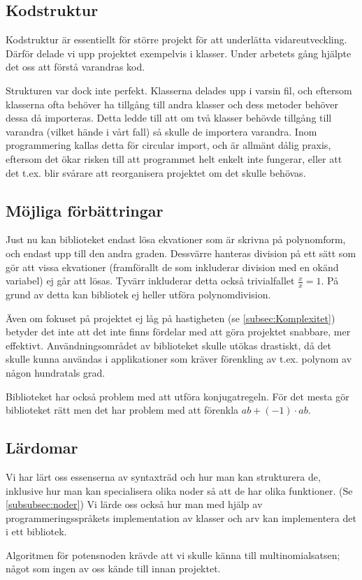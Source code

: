 \documentclass[12pt,a4paper]{article}
\begin{document}
\subsection{Kodstruktur}
Kodstruktur är essentiellt för större projekt för att underlätta vidareutveckling. Därför delade vi upp projektet exempelvis i klasser. Under arbetets gång hjälpte det oss att förstå varandras kod.
\par
Strukturen var dock inte perfekt. Klasserna delades upp i varsin fil, och eftersom klasserna ofta behöver ha tillgång till andra klasser och dess metoder behöver dessa då importeras. Detta ledde till att om två klasser behövde tillgång till varandra (vilket hände i vårt fall) så skulle de importera varandra. Inom programmering kallas detta för circular import, och är allmänt dålig praxis, eftersom det ökar risken till att programmet helt enkelt inte fungerar, eller att det t.ex. blir svårare att reorganisera projektet om det skulle behövas.
\subsection{Möjliga förbättringar}
Just nu kan biblioteket endast lösa ekvationer som är skrivna på polynomform, och endast upp till den andra graden. Dessvärre hanteras division på ett sätt som gör att vissa ekvationer (framförallt de som inkluderar division med en okänd variabel) ej går att lösas. Tyvärr inkluderar detta också trivialfallet \( \frac{x}{x} = 1 \). På grund av detta kan bibliotek ej heller utföra polynomdivision.
\par
Även om fokuset på projektet ej låg på hastigheten (se \ref{subsec:Komplexitet}) betyder det inte att det inte finns fördelar med att göra projektet snabbare, mer effektivt. Användningsområdet av biblioteket skulle utökas drastiskt, då det skulle kunna användas i applikationer som kräver förenkling av t.ex. polynom av någon hundratals grad.
\par
Biblioteket har också problem med att utföra konjugatregeln. För det mesta gör biblioteket rätt men det har problem med att förenkla \( ab + (-1) \cdot ab\).
\subsection{Lärdomar}
Vi har lärt oss essenserna av syntaxträd och hur man kan strukturera de, inklusive hur man kan specialisera olika noder så att de har olika funktioner. (Se \ref{subsubsec:noder}) Vi lärde oss också hur man med hjälp av programmeringsspråkets implementation av klasser och arv kan implementera det i ett bibliotek.
\par
Algoritmen för potensnoden krävde att vi skulle känna till multinomialsatsen; något som ingen av oss kände till innan projektet.
\end{document}
